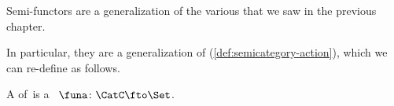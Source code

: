 Semi-functors are a generalization of the various  that we saw in the previous chapter.


In particular, they are a generalization of  (\cref{def:semicategory-action}), which we can re-define as follows.

\begin{ctdefinition}\label{def:semicat-action-redefined}
    A  of~\CatC is a ~$\funa\colon \CatC \fto \Set$.
\end{ctdefinition}

